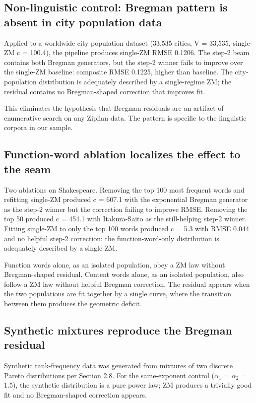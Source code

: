 \documentclass[11pt]{article}
\begin{document}
\subsection{Non-linguistic control: Bregman pattern is absent in city population data}

Applied to a worldwide city population dataset (33,535 cities, V = 33,535, single-ZM c = 100.4), the pipeline produces single-ZM RMSE 0.1206. The step-2 beam contains both Bregman generators, but the step-2 winner fails to improve over the single-ZM baseline: composite RMSE 0.1225, higher than baseline. The city-population distribution is adequately described by a single-regime ZM; the residual contains no Bregman-shaped correction that improves fit.

This eliminates the hypothesis that Bregman residuals are an artifact of enumerative search on any Zipfian data. The pattern is specific to the linguistic corpora in our sample.

\subsection{Function-word ablation localizes the effect to the seam}

Two ablations on Shakespeare. Removing the top 100 most frequent words and refitting single-ZM produced c = 607.1 with the exponential Bregman generator as the step-2 winner but the correction failing to improve RMSE. Removing the top 50 produced c = 454.1 with Itakura-Saito as the still-helping step-2 winner. Fitting single-ZM to only the top 100 words produced c = 5.3 with RMSE 0.044 and no helpful step-2 correction: the function-word-only distribution is adequately described by a single ZM.

Function words alone, as an isolated population, obey a ZM law without Bregman-shaped residual. Content words alone, as an isolated population, also follow a ZM law without helpful Bregman correction. The residual appears when the two populations are fit together by a single curve, where the transition between them produces the geometric deficit.

\subsection{Synthetic mixtures reproduce the Bregman residual}

Synthetic rank-frequency data was generated from mixtures of two discrete Pareto distributions per Section 2.8. For the same-exponent control ($\alpha_1$ = $\alpha_2$ = 1.5), the synthetic distribution is a pure power law; ZM produces a trivially good fit and no Bregman-shaped correction appears.
\end{document}
